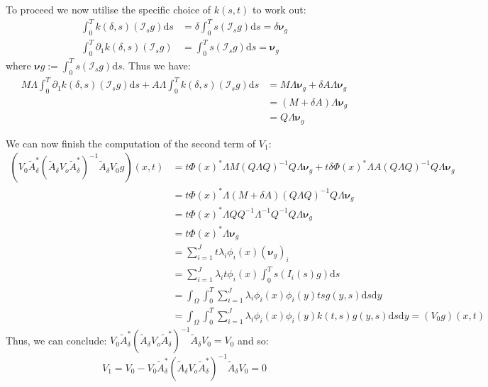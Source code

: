 \documentclass{article}
\theoremstyle{definition}
\theoremstyle{remark}
\theoremstyle{remark}
\begin{document}
To proceed we now utilise the specific choice of $k(s,t)$ to work out:
\begin{align*}
    \int_{0}^{T}k(\delta,s)(\mathcal{I}_{s}g)\mathrm{d}s &= \delta\int_{0}^{T}s(\mathcal{I}_{s}g)\mathrm{d}s = \delta\boldsymbol{\nu}_{g} \\
    \int_{0}^{T}\partial_{1}k(\delta,s)(\mathcal{I}_{s}g) &= \int_{0}^{T}s(\mathcal{I}_{s}g)\mathrm{d}s=\boldsymbol{\nu}_{g}
\end{align*}
where $\boldsymbol{\nu}g:=\int_{0}^{T}s(\mathcal{I}_{s}g)\mathrm{d}s$.
Thus we have:
\begin{align*}
    M\Lambda\int_{0}^{T}\partial_{1}k(\delta,s)(\mathcal{I}_{s}g)\mathrm{d}s + A\Lambda\int_{0}^{T}k(\delta,s)(\mathcal{I}_{s}g)\mathrm{d}s
    &= M\Lambda\boldsymbol{\nu}_{g}+\delta A\Lambda\boldsymbol{\nu}_{g} \\
    &=(M+\delta A)\Lambda\boldsymbol{\nu}_{g} \\
    &=Q\Lambda\boldsymbol{\nu}_{g}
\end{align*}

We can now finish the computation of the second term of $V_{1}$:
\begin{align*}
    (V_{0}\tilde{A}_{\delta}^{*}(\tilde{A}_{\delta}V_{o}\tilde{A}_{\delta}^{*})^{-1}\tilde{A}_{\delta}V_{0}g)(x,t) &= t\Phi(x)^{*}\Lambda M(Q\Lambda Q)^{-1}Q\Lambda\boldsymbol{\nu}_{g} + t\delta\Phi(x)^{*}\Lambda A(Q\Lambda Q)^{-1}Q\Lambda\boldsymbol{\nu}_{g} \\
    &= t\Phi(x)^{*}\Lambda(M+\delta A)(Q\Lambda Q)^{-1}Q\Lambda\boldsymbol{\nu}_{g} \\
    &= t\Phi(x)^{*}\Lambda QQ^{-1}\Lambda^{-1}Q^{-1}Q\Lambda\boldsymbol{\nu}_{g} \\
    &= t\Phi(x)^{*}\Lambda\boldsymbol{\nu}_{g} \\
    &= \sum_{i=1}^{J}t\lambda_{i}\phi_{i}(x)(\boldsymbol{\nu}_{g})_{i} \\
    &= \sum_{i=1}^{J}\lambda_{i}t\phi_{i}(x)\int_{0}^{T}s(I_{i}(s)g)\mathrm{d}s \\
    &= \int_{\Omega}\int_{0}^{T}\sum_{i=1}^{J}\lambda_{i}\phi_{i}(x)\phi_{i}(y)tsg(y,s)\mathrm{d}s\mathrm{d}y \\
    &= \int_{\Omega}\int_{0}^{T}\sum_{i=1}^{J}\lambda_{i}\phi_{i}(x)\phi_{i}(y)k(t,s)g(y,s)\mathrm{d}s\mathrm{d}y = (V_{0}g)(x,t)
\end{align*}
Thus, we can conclude: $V_{0}\tilde{A}_{\delta}^{*}(\tilde{A}_{\delta}V_{o}\tilde{A}_{\delta}^{*})^{-1}\tilde{A}_{\delta}V_{0}=V_{0}$ and so:
\begin{equation}
    V_{1}=V_{0}-V_{0}\tilde{A}_{\delta}^{*}(\tilde{A}_{\delta}V_{o}\tilde{A}_{\delta}^{*})^{-1}\tilde{A}_{\delta}V_{0} = 0
\end{equation}
\end{document}
